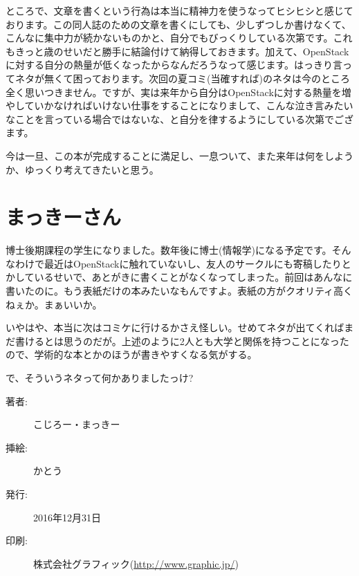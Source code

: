 \documentclass[9pt,b5paper,papersize,openany]{jsbook}
\begin{document}
ところで、文章を書くという行為は本当に精神力を使うなってヒシヒシと感じております。この同人誌のための文章を書くにしても、少しずつしか書けなくて、こんなに集中力が続かないものかと、自分でもびっくりしている次第です。これもきっと歳のせいだと勝手に結論付けて納得しておきます。加えて、OpenStackに対する自分の熱量が低くなったからなんだろうなって感じます。はっきり言ってネタが無くて困っております。次回の夏コミ(当確すれば)のネタは今のところ全く思いつきません。ですが、実は来年から自分はOpenStackに対する熱量を増やしていかなければいけない仕事をすることになりまして、こんな泣き言みたいなことを言っている場合ではないな、と自分を律するようにしている次第でござます。

今は一旦、この本が完成することに満足し、一息ついて、また来年は何をしようか、ゆっくり考えてきたいと思う。

\section*{まっきーさん}

博士後期課程の学生になりました。数年後に博士(情報学)になる予定です。そんなわけで最近はOpenStackに触れていないし、友人のサークルにも寄稿したりとかしているせいで、あとがきに書くことがなくなってしまった。前回はあんなに書いたのに。もう表紙だけの本みたいなもんですよ。表紙の方がクオリティ高くねぇか。まぁいいか。

いやはや、本当に次はコミケに行けるかさえ怪しい。せめてネタが出てくればまだ書けるとは思うのだが。上述のように2人とも大学と関係を持つことになったので、学術的な本とかのほうが書きやすくなる気がする。

で、そういうネタって何かありましたっけ?

\newpage
\thispagestyle{empty}
\begin{minipage}{0.5\paperwidth}
	\begin{description}
		\item[著者:]こじろー・まっきー
		\item[挿絵:]かとう
		\item[発行:]2016年12月31日
		\item[印刷:]株式会社グラフィック(\url{http://www.graphic.jp/})
	\end{description}
\end{minipage}
\end{document}
